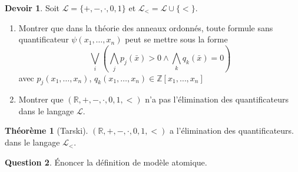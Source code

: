 \documentclass[12pt,a4paper]{exprog}
\theoremstyle{definition} \newtheorem{thm}{Th\'{e}or\`{e}me}
\theoremstyle{definition} \newtheorem{quest}{Question}
\theoremstyle{definition} \newtheorem{dev}[quest]{Devoir}
\begin{document}
\begin{dev}
  Soit $\mathcal{L}= \{+, -, \cdot, 0, 1\}$ et
  $\mathcal{L}_{<} = \mathcal{L}\cup \{<\}$.
  \begin{enumerate}
  \item\sloppypar Montrer que dans la théorie des anneaux ordonnés, toute
    formule sans quantificateur $\psi(x_1, \ldots, x_n)$ peut
    se mettre sous la forme
    \begin{equation}
      \bigvee\limits_i \left(
        \bigwedge\limits_j p_j(\bar{x}) > 0 \land
        \bigwedge\limits_k q_k(\bar{x})=0
      \right)
    \end{equation}
    avec $p_j(x_1, \ldots, x_n)$,
    $q_k(x_1, \ldots, x_n)\in\mathbb Z[x_1, \ldots, x_n]$
  \item Montrer que $(\mathbb R, +, -, \cdot, 0, 1, <)$ n'a pas
    l'élimination des quantificateurs dans le langage $\mathcal L$.
  \end{enumerate}

\end{dev}

\begin{thm}[Tarski]
  $(\mathbb R, +, -, \cdot, 0, 1, <)$ a l'élimination des
  quantificateurs. dans le langage $\mathcal L_{<}$.
\end{thm}

\begin{quest}
  \'{E}noncer la définition de modèle atomique.
\end{quest}
\end{document}
